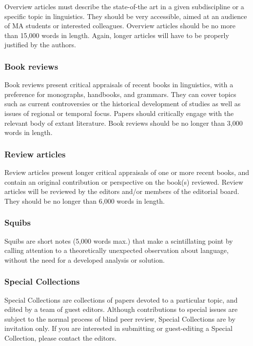 \documentclass[charis,linguex,biblatex]{glossa}
\begin{document}
Overview articles must describe the state-of-the art in a given subdiscipline or a specific topic in linguistics. They should be very accessible, aimed at an audience of MA students or interested colleagues. Overview articles should be no more than 15,000 words in length. Again, longer articles will have to be properly justified by the authors.

\subsubsection{Book reviews}

Book reviews present critical appraisals of recent books in linguistics, with a preference for monographs, handbooks, and grammars. They can cover topics such as current controversies or the historical development of studies as well as issues of regional or temporal focus. Papers should critically engage with the relevant body of extant literature. Book reviews should be no longer than 3,000 words in length.

\subsubsection{Review articles}

Review articles present longer critical appraisals of one or more recent books, and contain an original contribution or perspective on the book(s) reviewed. Review articles will be reviewed by the editors and/or members of the editorial board. They should be no longer than 6,000 words in length.

\subsubsection{Squibs}

Squibs are short notes (5,000 words max.) that make a scintillating point by calling attention to a theoretically unexpected observation about language, without the need for a developed analysis or solution.

\subsubsection{Special Collections}

Special Collections are collections of papers devoted to a particular topic, and edited by a team of guest editors. Although contributions to special issues are subject to the normal process of blind peer review, Special Collections are by invitation only. If you are interested in submitting or guest-editing a Special Collection, please contact the editors.
\end{document}
